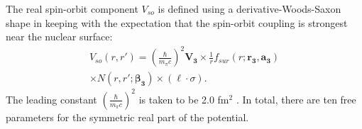 \documentclass[twocolumn,secnumarabic,amssymb, nobibnotes, aps, prl,
superscriptaddress, nobalancelastpage, draft]{revtex4}
\begin{document}
The real spin-orbit component $V_{so}$ is defined using a derivative-Woods-Saxon
shape in keeping with the expectation that the spin-orbit coupling is strongest near the
nuclear surface:
\begin{equation} \label{RealSOEquation}
    \begin{split}
        V_{so}(r,r') = \left(\frac{\hbar}{m_{\pi}c}\right)^{2}
        \mathbf{V_{3}}\times\frac{1}{r}f_{sur}(r;\mathbf{r_{3}}, \mathbf{a_{3}})\\
        {\times}N(r,r';\boldsymbol{\beta_{3}}) {\times}(\ell\cdot\sigma).
    \end{split}
\end{equation}
The leading constant $\left(\frac{\hbar}{m_{\pi}c}\right)^{2}$ is taken to be 2.0 fm$^{2}$
\cite{MahzoonPhDThesis}. In total, there are ten free parameters for the
symmetric real part of the potential.
\end{document}
